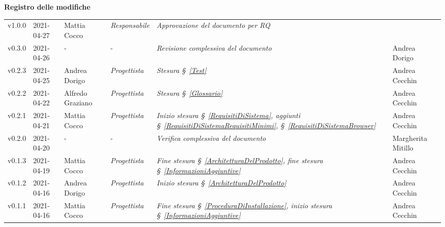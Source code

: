 \quad
\begin{center}
	\LARGE\textbf{Registro delle modifiche}
\end{center}
\def\tabularxcolumn#1{m{#1}}
{

\begin{center}
	\renewcommand{\arraystretch}{1.4}
	\begin{longtable}[c]{|p{2cm-1\tabcolsep}|p{2cm}|p{3cm-2\tabcolsep}|p{3cm-1.5\tabcolsep}|p{}|p{4cm-2\tabcolsep}|}
		\hline
		\rowcolor{airforceblue}
		\makecell[c]{\textbf{Versione}} & \makecell[c]{\textbf{Data}} & \makecell[c]{\textbf{Autore}} & \makecell[c]{\textbf{Ruolo}} & \makecell[c]{\textbf{Modifica}} &  \makecell[c]{\textbf{Verificatore}}\\
		\hline
		\centering v1.0.0 & 2021-04-27 & Mattia Cocco & \centering \textit{Responsabile} & \textit{Approvazione del documento per RQ}  & \makecell[c]{-}\\
		\hline
		\hline
		\centering v0.3.0 & 2021-04-26 &\centering - &\centering - & \textit{Revisione complessiva del documento} & Andrea Dorigo\\
		\hline
		\hline
		\centering v0.2.3 & 2021-04-25 & Andrea Dorigo & \centering \textit{Progettista} & \textit{Stesura \S~\ref{Test}} & Andrea Cecchin\\
		\hline
		\hline
		\centering v0.2.2 & 2021-04-22 & Alfredo Graziano & \centering \textit{Progettista} & \textit{Stesura \S~\ref{Glossario}} & Andrea Cecchin\\
		\hline
		\hline
		\centering v0.2.1 & 2021-04-21 & Mattia Cocco & \centering \textit{Progettista} & \textit{Inizio stesura \S~\ref{RequisitiDiSistema}, aggiunti \S~\ref{RequisitiDiSistemaRequisitiMinimi}, \S~\ref{RequisitiDiSistemaBrowser}} & Andrea Cecchin\\
		\hline
		\hline
		\centering v0.2.0 & 2021-04-20 & \centering- & \centering- & \textit{Verifica complessiva del documento} & Margherita Mitillo \\
		\hline
		\hline
		\centering v0.1.3 & 2021-04-19 & Mattia Cocco & \centering \textit{Progettista} & \textit{Fine stesura \S~\ref{ArchitetturaDelProdotto}, fine stesura \S~\ref{InformazioniAggiuntive}} & Andrea Cecchin\\
		\hline
		\hline
		\centering v0.1.2 & 2021-04-16 & Andrea Dorigo & \centering \textit{Progettista} & \textit{Inizio stesura \S~\ref{ArchitetturaDelProdotto}} & Andrea Cecchin\\
		\hline
		\hline
		\centering v0.1.1 & 2021-04-16 & Mattia Cocco & \centering \textit{Progettista} & \textit{Fine stesura \S~\ref{ProceduraDiInstallazione}, inizio stesura \S~\ref{InformazioniAggiuntive}} & Andrea Cecchin \\

\end{longtable}
\end{center}}
